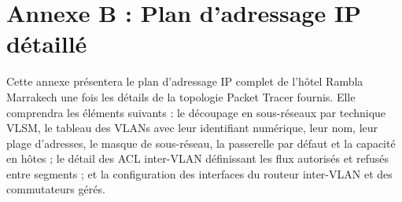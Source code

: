 \documentclass[12pt,a4paper]{report}
\begin{document}
\section*{Annexe B : Plan d'adressage IP détaillé}

Cette annexe présentera le plan d'adressage IP complet de l'hôtel Rambla
Marrakech une fois les détails de la topologie Packet Tracer fournis. Elle
comprendra les éléments suivants : le découpage en sous-réseaux par
technique VLSM, le tableau des VLANs avec leur identifiant numérique, leur
nom, leur plage d'adresses, le masque de sous-réseau, la passerelle par
défaut et la capacité en hôtes ; le détail des ACL inter-VLAN définissant
les flux autorisés et refusés entre segments ; et la configuration des
interfaces du routeur inter-VLAN et des commutateurs gérés.
\end{document}
